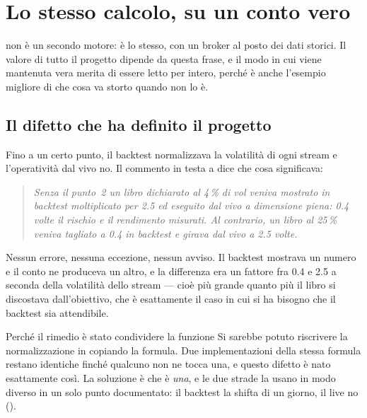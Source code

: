 \section{Lo stesso calcolo, su un conto vero}\label{sez:live}
\raggedbottom

\pkgLive{} non è un secondo motore: è lo stesso, con un broker al posto dei
dati storici. Il valore di tutto il progetto dipende da questa frase, e il
modo in cui viene mantenuta vera merita di essere letto per intero, perché è
anche l'esempio migliore di che cosa va storto quando non lo è.

\subsection{Il difetto che ha definito il progetto}

Fino a un certo punto, il backtest normalizzava la volatilità di ogni stream
e l'operatività dal vivo no. Il commento in testa a
 dice che cosa significava:

\begin{quote}\itshape
Senza il punto~2 un libro dichiarato al \num{4}\,\% di vol veniva mostrato
in backtest moltiplicato per \num{2.5} ed eseguito dal vivo a dimensione
piena: \num{0.4} volte il rischio e il rendimento misurati. Al contrario, un
libro al \num{25}\,\% veniva tagliato a \num{0.4} in backtest e girava dal
vivo a \num{2.5} volte.
\end{quote}

\noindent
Nessun errore, nessuna eccezione, nessun avviso. Il backtest mostrava un
numero e il conto ne produceva un altro, e la differenza era un fattore fra
\num{0.4} e \num{2.5} a seconda della volatilità dello stream --- cioè più
grande quanto più il libro si discostava dall'obiettivo, che è esattamente il
caso in cui si ha bisogno che il backtest sia attendibile.

\begin{perche}{Perché il rimedio è stato condividere la funzione}
Si sarebbe potuto riscrivere la normalizzazione in \pkgLive{} copiando la
formula. Due implementazioni della stessa formula restano identiche finché
qualcuno non ne tocca una, e questo difetto è nato esattamente così. La
soluzione è che  è \emph{una}, e le due strade la
usano in modo diverso in un solo punto documentato: il backtest la shifta di
un giorno, il live no ().
\end{perche}

